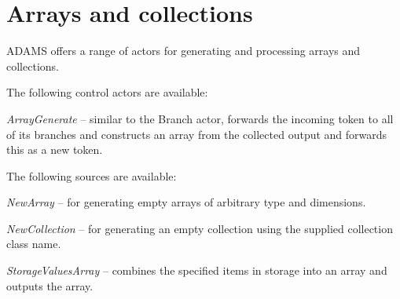 \newpage
\section{Arrays and collections}
\label{arrays_and_collections}
ADAMS offers a range of actors for generating and processing arrays and
collections.

\noindent The following control actors are available:
\begin{tight_itemize}
	\item \textit{ArrayGenerate} -- similar to the Branch actor, forwards
	the incoming token to all of its branches and constructs an array from
	the collected output and forwards this as a new token.
\end{tight_itemize}

\noindent The following sources are available:
\begin{tight_itemize}
	\item \textit{NewArray} -- for generating empty arrays of arbitrary type 
	and dimensions.
	\item \textit{NewCollection} -- for generating an empty collection using
	the supplied collection class name.
	\item \textit{StorageValuesArray} -- combines the specified items in
	storage into an array and outputs the array.
\end{tight_itemize}

